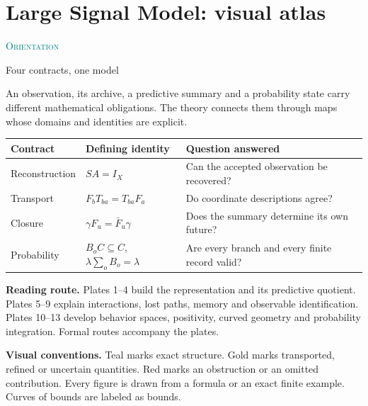 \documentclass[11pt,oneside,openany]{book}
\numberwithin{equation}{section}
\begin{document}
\chapter{Large Signal Model: visual atlas}
\textcolor{teal}{\small\textsc{Orientation}}\par
{\fontsize{23}{26}\selectfont Four contracts, one model}\par
An observation, its archive, a predictive summary and a probability state carry different mathematical obligations. The theory connects them through maps whose domains and identities are explicit.
\begin{tabular}{@{}p{.19\linewidth}p{.32\linewidth}p{.42\linewidth}@{}}
\toprule
Contract & Defining identity & Question answered\\\midrule
Reconstruction & $SA=I_X$ & Can the accepted observation be recovered?\\[5pt]
Transport & $F_bT_{ba}=T_{ba}F_a$ & Do coordinate descriptions agree?\\[5pt]
Closure & $\gamma F_u=\bar F_u\gamma$ & Does the summary determine its own future?\\[5pt]
Probability & $B_oC\subseteq C$, $\lambda\sum_oB_o=\lambda$ & Are every branch and every finite record valid?\\\bottomrule
\end{tabular}
\vspace{10pt}
\textbf{Reading route.} Plates 1--4 build the representation and its predictive quotient. Plates 5--9 explain interactions, lost paths, memory and observable identification. Plates 10--13 develop behavior spaces, positivity, curved geometry and probability integration. Formal routes accompany the plates.

\textbf{Visual conventions.} Teal marks exact structure. Gold marks transported, refined or uncertain quantities. Red marks an obstruction or an omitted contribution. Every figure is drawn from a formula or an exact finite example. Curves of bounds are labeled as bounds.

\end{document}
